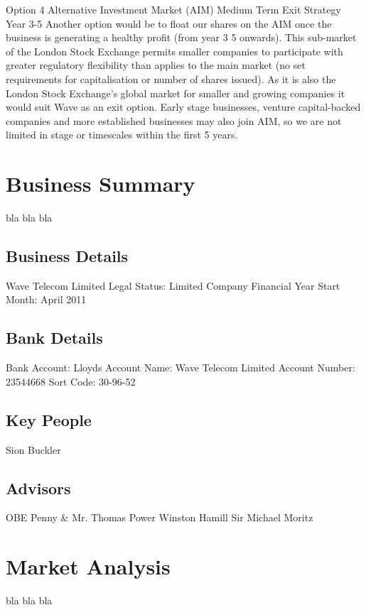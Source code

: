 \documentclass[letterpaper,10pt,openany,oneside,english]{sphinxmanual}
\begin{document}
Option 4 \textendash{} Alternative Investment Market (AIM)
Medium Term Exit Strategy Year 3-5
Another option would be to float our shares on the AIM once the business is generating a
healthy profit (from year 3 \textendash{} 5 onwards). This sub-market of the London Stock Exchange permits
smaller companies to participate with greater regulatory flexibility than applies to the main
market (no set requirements for capitalisation or number of shares issued). As it is also the
London Stock Exchange’s global market for smaller and growing companies it would suit Wave
as an exit option. Early stage businesses, venture capital-backed companies and more
established businesses may also join AIM, so we are not limited in stage or timescales within the
first 5 years.


\chapter{Business Summary}
\label{\detokenize{business-summary:business-summary}}\label{\detokenize{business-summary::doc}}
bla bla bla


\section{Business Details}
\label{\detokenize{business-summary:business-details}}
Wave Telecom Limited
Legal Status: Limited Company
Financial Year Start Month: April 2011


\section{Bank Details}
\label{\detokenize{business-summary:bank-details}}
Bank Account: Lloyds
Account Name: Wave Telecom Limited
Account Number: 23544668
Sort Code: 30-96-52


\section{Key People}
\label{\detokenize{business-summary:key-people}}
Sion Buckler


\section{Advisors}
\label{\detokenize{business-summary:advisors}}
OBE Penny \& Mr. Thomas Power
Winston Hamill
Sir Michael Moritz


\chapter{Market Analysis}
\label{\detokenize{market-analysis:market-analysis}}\label{\detokenize{market-analysis::doc}}
bla bla bla
\end{document}
